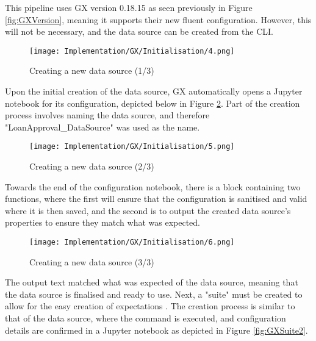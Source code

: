 
\para This pipeline uses GX version 0.18.15 as seen previously in Figure \ref{fig:GXVersion},
meaning it supports their new fluent configuration. However, this will not be necessary,
and the data source can be created from the CLI.

\begin{figure}[H]
    \centering
    \texttt{[image: Implementation/GX/Initialisation/4.png]}
    \caption{Creating a new data source (1/3)}
    \label{fig:GXDatasource1}
\end{figure}

\para Upon the initial creation of the data source, GX automatically opens a Jupyter notebook for its 
configuration, depicted below in Figure \ref{fig:GXDatasource2}. Part of the creation process 
involves naming the data source, and therefore "LoanApproval\_DataSource" was used as the name.

\begin{figure}[H]
    \centering
    \texttt{[image: Implementation/GX/Initialisation/5.png]}
    \caption{Creating a new data source (2/3)}
    \label{fig:GXDatasource2}
\end{figure}

\para Towards the end of the configuration notebook, there is a block containing two functions, where the first 
will ensure that the configuration is sanitised and valid where it is then saved, and the second is to output the created 
data source's properties to ensure they match what was expected.

\begin{figure}[H]
    \centering
    \texttt{[image: Implementation/GX/Initialisation/6.png]}
    \caption{Creating a new data source (3/3)}
    \label{fig:GXDatasource3}
\end{figure}

\para The output text matched what was expected of the data source, meaning that the data source is finalised
and ready to use. Next, a "suite" must be created to allow for the easy creation of expectations \autocite{gx_expectation_nodate}.
The creation process is similar to that of the data source, where the command is executed, and configuration details are confirmed in 
a Jupyter notebook as depicted in Figure \ref{fig:GXSuite2}.

